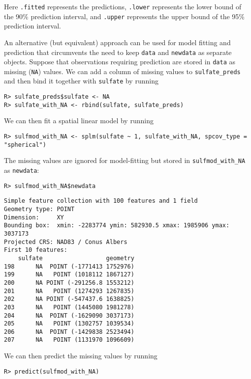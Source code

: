 \documentclass[10pt,letterpaper]{article}
\begin{document}
Here \texttt{.fitted} represents the predictions, \texttt{.lower}
represents the lower bound of the 90\% prediction interval, and
\texttt{.upper} represents the upper bound of the 95\% prediction
interval.

An alternative (but equivalent) approach can be used for model fitting
and prediction that circumvents the need to keep \texttt{data} and
\texttt{newdata} as separate objects. Suppose that observations
requiring prediction are stored in \texttt{data} as missing
(\texttt{NA}) values. We can add a column of missing values to
\texttt{sulfate\_preds} and then bind it together with \texttt{sulfate}
by running

\begin{verbatim}
R> sulfate_preds$sulfate <- NA
R> sulfate_with_NA <- rbind(sulfate, sulfate_preds)
\end{verbatim}

We can then fit a spatial linear model by running

\begin{verbatim}
R> sulfmod_with_NA <- splm(sulfate ~ 1, sulfate_with_NA, spcov_type = "spherical")
\end{verbatim}

The missing values are ignored for model-fitting but stored in
\texttt{sulfmod\_with\_NA} as \texttt{newdata}:

\begin{verbatim}
R> sulfmod_with_NA$newdata
\end{verbatim}

\begin{verbatim}
Simple feature collection with 100 features and 1 field
Geometry type: POINT
Dimension:     XY
Bounding box:  xmin: -2283774 ymin: 582930.5 xmax: 1985906 ymax: 3037173
Projected CRS: NAD83 / Conus Albers
First 10 features:
    sulfate                  geometry
198      NA  POINT (-1771413 1752976)
199      NA   POINT (1018112 1867127)
200      NA POINT (-291256.8 1553212)
201      NA   POINT (1274293 1267835)
202      NA POINT (-547437.6 1638825)
203      NA   POINT (1445080 1981278)
204      NA  POINT (-1629090 3037173)
205      NA   POINT (1302757 1039534)
206      NA  POINT (-1429838 2523494)
207      NA   POINT (1131970 1096609)
\end{verbatim}

We can then predict the missing values by running

\begin{verbatim}
R> predict(sulfmod_with_NA)
\end{verbatim}
\end{document}
